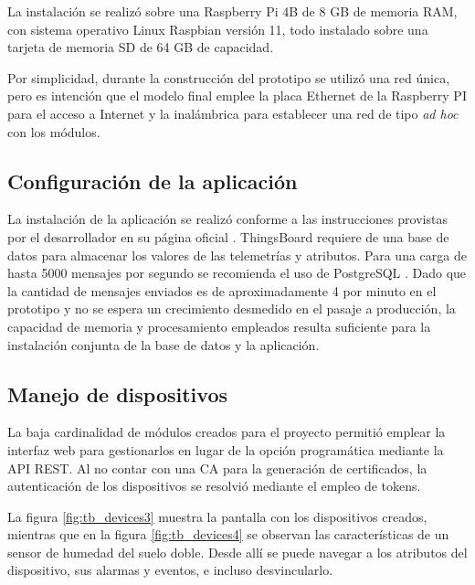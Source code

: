 La instalación se realizó sobre una Raspberry Pi 4B de 8 GB de memoria RAM, con sistema operativo Linux Raspbian versión 11, todo instalado sobre una tarjeta de memoria SD de 64 GB de capacidad.

Por simplicidad, durante la construcción del prototipo se utilizó una red única, pero es intención que el modelo final emplee la placa Ethernet de la Raspberry PI para el acceso a Internet y la inalámbrica para establecer una red de tipo \textit{ad hoc} con los módulos.


\subsection{Configuración de la aplicación}
\label{sec:Configuración de la aplicación}

La instalación de la aplicación se realizó conforme a las instrucciones provistas por el desarrollador en su página oficial \citep{tb_install}.
ThingsBoard requiere de una base de datos para almacenar los valores de las telemetrías y atributos. Para una carga de hasta 5000 mensajes por segundo se recomienda el uso de PostgreSQL \citep{postgresql}. Dado que la cantidad de mensajes enviados es de aproximadamente 4 por minuto en el prototipo y no se espera un crecimiento desmedido en el pasaje a producción, la capacidad de memoria y procesamiento empleados resulta suficiente para la instalación conjunta de la base de datos y la aplicación.

\subsection{Manejo de dispositivos}
\label{sec:Manejo de dispositivos}

La baja cardinalidad de módulos creados para el proyecto permitió emplear la interfaz web para gestionarlos en lugar de la opción programática mediante la API REST.
Al no contar con una CA para la generación de certificados, la autenticación de los dispositivos se resolvió mediante el empleo de tokens.

La figura \ref{fig:tb_devices3} muestra la pantalla con los dispositivos creados, mientras que en la figura \ref{fig:tb_devices4} se observan las características de un sensor de humedad del suelo doble. Desde allí se puede navegar a los atributos del dispositivo, sus alarmas y eventos, e incluso desvincularlo.



%



